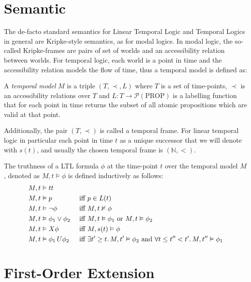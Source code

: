 \section{Semantic}

The de-facto standard semantics for Linear Temporal Logic and Temporal Logics in general are Kripke-style semantics, as
for modal logics. In modal logic, the so-called Kripke-frames are pairs of set of worlds and an accessibility relation
between worlds. For temporal logic, each world is a point in time and the accessibility relation models the flow of
time, thus a temporal model is defined as:

\begin{definition}
  A \emph{temporal model} $M$ is a triple $(T, \prec, L)$ where $T$ is a set of time-points, $\prec$ is an accessibility
  relations over $T$ and $L : T \to \mathcal{P}(\text{PROP})$ is a labelling function that for each point in time
  returns the subset of all atomic propositions which are valid at that point.
\end{definition}

Additionally, the pair $(T, \prec)$ is called a temporal frame. For linear temporal logic in particular each point in
time $t$ as a unique successor that we will denote with $s(t)$, and usually the chosen temporal frame is $(\mathbb{N},
<)$.
\begin{definition}
  The truthness of a LTL formula $\phi$ at the time-point $t$ over the temporal model $M$, denoted as
  $M, t \vDash \phi$ is defined inductively as follows:
  \begin{align*}
    M, t &\vDash tt && \\
    M, t &\vDash p &&\text{ iff } p \in L(t) \\
    M, t &\vDash \neg\phi &&\text{ iff } M, t \nvDash \phi \\
    M, t &\vDash \phi_1 \lor \phi_2 &&\text{ iff } M, t \vDash \phi_1 \text{ or } M, t \vDash \phi_2 \\
    M, t &\vDash X{\phi} &&\text{ iff } M, s(t) \vDash \phi \\
    M, t &\vDash {\phi_1}\,U {\phi_2} &&\text{ iff } \exists t' \geq t \ldotp M, t' \vDash \phi_2 \text{ and } \forall t
      \leq t'' < t' \ldotp M, t'' \vDash \phi_1 \\
  \end{align*}
\end{definition}

\section{First-Order Extension}

